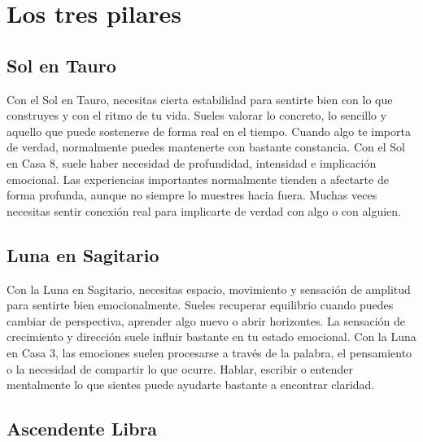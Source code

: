 \documentclass[11pt,a4paper]{article}
\begin{document}
\vspace{0.8cm}


\section{Los tres pilares}

\subsection{Sol en Tauro}

Con el Sol en Tauro, necesitas cierta estabilidad para sentirte bien con lo que construyes y con el ritmo de tu vida. Sueles valorar lo concreto, lo sencillo y aquello que puede sostenerse de forma real en el tiempo. Cuando algo te importa de verdad, normalmente puedes mantenerte con bastante constancia. Con el Sol en Casa 8, suele haber necesidad de profundidad, intensidad e implicación emocional. Las experiencias importantes normalmente tienden a afectarte de forma profunda, aunque no siempre lo muestres hacia fuera. Muchas veces necesitas sentir conexión real para implicarte de verdad con algo o con alguien.

\vspace{0.8cm}

\subsection{Luna en Sagitario}

Con la Luna en Sagitario, necesitas espacio, movimiento y sensación de amplitud para sentirte bien emocionalmente. Sueles recuperar equilibrio cuando puedes cambiar de perspectiva, aprender algo nuevo o abrir horizontes. La sensación de crecimiento y dirección suele influir bastante en tu estado emocional. Con la Luna en Casa 3, las emociones suelen procesarse a través de la palabra, el pensamiento o la necesidad de compartir lo que ocurre. Hablar, escribir o entender mentalmente lo que sientes puede ayudarte bastante a encontrar claridad.

\vspace{0.8cm}

\subsection{Ascendente Libra}
\end{document}
